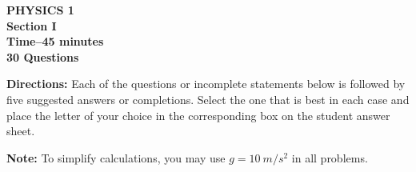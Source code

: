 \documentclass[11pt]{article}
\begin{document}
\begin{center}
  \textbf{PHYSICS 1\\
    Section I\\
    Time--45 minutes\\%
    30 Questions %
  }
\end{center}

\textbf{Directions:} Each of the questions or incomplete statements below is
followed by five suggested answers or completions. Select the one that is best
in each case and place the letter of your choice in the corresponding box on
the student answer sheet.

\vspace{10pt}
\textbf{Note:} To simplify calculations, you may use $g=\SI{10}{m/s^2}$ in all
problems.
\end{document}
